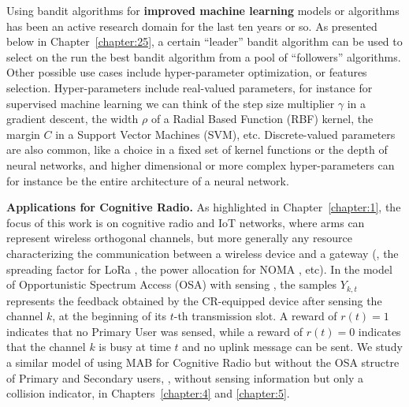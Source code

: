     Using bandit algorithms for \textbf{improved machine learning} models or algorithms has been an active research domain for the last ten years or so.
    As presented below in Chapter~\ref{chapter:25}, a certain ``leader'' bandit algorithm can be used to select on the run the best bandit algorithm from a pool of ``followers'' algorithms.
    Other possible use cases include hyper-parameter optimization, or features selection.
    Hyper-parameters include real-valued parameters,
    for instance for supervised machine learning we can think of
    the step size multiplier $\gamma$ in a gradient descent,
    the width $\rho$ of a Radial Based Function (RBF) kernel,
    the margin $C$ in a Support Vector Machines (SVM), etc.
    Discrete-valued parameters are also common, like a choice in a fixed set of kernel functions or the depth of neural networks,
    and higher dimensional or more complex hyper-parameters can for instance be the entire architecture of a neural network.


\textbf{Applications for Cognitive Radio.}
%
As highlighted in Chapter~\ref{chapter:1},
the focus of this work is on cognitive radio and IoT networks, where arms can represent wireless orthogonal channels, but more generally any resource characterizing the communication between a wireless device and a gateway (\eg, the spreading factor for LoRa \cite{KerkoucheAlami18}, the power allocation for NOMA \cite{TianWangWangSong2019}, etc).
%
In the model of Opportunistic Spectrum Access (OSA) with sensing \cite{Jouini09,Jouini10}, the samples $Y_{k,t}$ represents the feedback obtained by the CR-equipped device after sensing the channel $k$, at the beginning of its $t$-th transmission slot.
A reward of $r(t) = 1$ indicates that no Primary User was sensed, while a reward of $r(t)=0$ indicates that the channel $k$ is busy at time $t$ and no uplink message can be sent.
%
We study a similar model of using MAB for Cognitive Radio but without the OSA structre of Primary and Secondary users, \ie, without sensing information but only a collision indicator, in Chapters~\ref{chapter:4} and \ref{chapter:5}.


